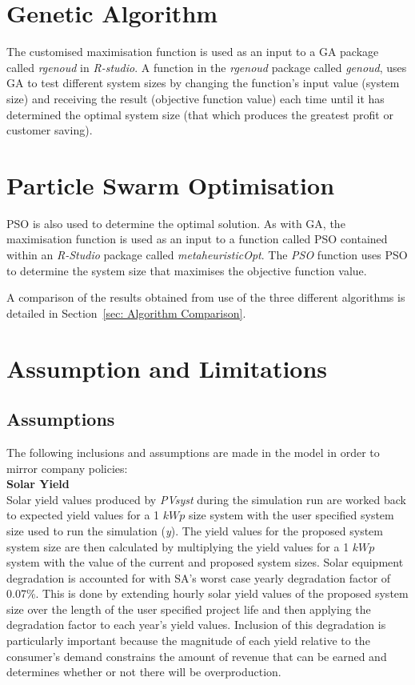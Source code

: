 \documentclass[a4paper,11pt,fleqn]{report}
\begin{document}
\section{Genetic Algorithm} \label{sec: Genetic Algorithm}
The customised maximisation function is used as an input to a \ac{GA} package called \textit{rgenoud} in \textit{R-studio}. A function in the \textit{rgenoud} package called \textit{genoud}, uses \ac{GA} to test different system sizes by changing the function's input value (system size) and receiving the result (objective function value) each time until it has determined the optimal system size (that which produces the greatest profit or customer saving).

\section{Particle Swarm Optimisation} \label{sec: PSO}
\ac{PSO} is also used to determine the optimal solution. As with \ac{GA}, the maximisation function is used as an input to a function called \ac{PSO} contained within an \textit{R-Studio} package called \textit{metaheuristicOpt}. The \textit{PSO} function uses \ac{PSO} to determine the system size that maximises the objective function value.

A comparison of the results obtained from use of the three different algorithms is detailed in Section~\ref{sec: Algorithm Comparison}.

\section{Assumption and Limitations} \label{sec: Model Assumptions}

\subsection{Assumptions}
The following inclusions and assumptions are made in the model in order to mirror company policies:\\

\noindent\textbf{Solar Yield}\\
Solar yield values produced by \textit{PVsyst} during the simulation run are worked back to expected yield values for a 1 $kWp$ size system with the user specified system size used to run the simulation (\textit{y}). The yield values for the proposed system system size are then calculated by multiplying the yield values for a 1 $kWp$ system with the value of the current and proposed system sizes. Solar equipment degradation is accounted for with \ac{SA}'s worst case yearly degradation factor of 0.07\%. This is done by extending hourly solar yield values of the proposed system size over the length of the user specified project life and then applying the degradation factor to each year's yield values. Inclusion of this degradation is particularly important because the magnitude of each yield relative to the consumer's demand constrains the amount of revenue that can be earned and determines whether or not there will be overproduction.\\
\end{document}

